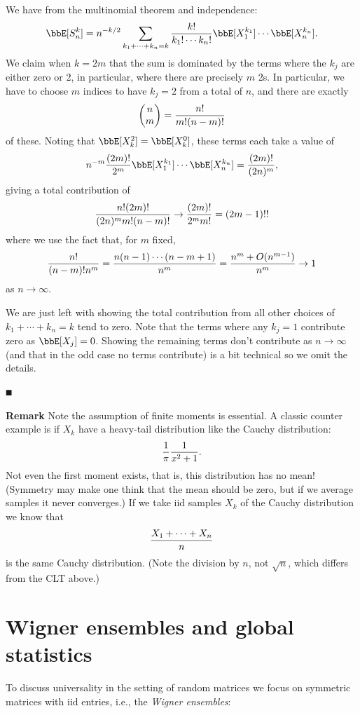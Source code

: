 We have from the multinomial theorem and independence:
\[
\ensuremath{\bbE}[S_n^k] = n^{-k/2} \ensuremath{\sum}_{k_1 + \ensuremath{\cdots} + k_n = k}  {k! \over k_1! \ensuremath{\cdots} k_n!}  \ensuremath{\bbE}[X_1^{k_1}] \ensuremath{\cdots}  \ensuremath{\bbE}[X_n^{k_n}].
\]
We claim when $k = 2m$ that the sum is dominated by the terms where the $k_j$ are either zero or 2, in particular, where there are precisely $m$ 2s. In particular, we have to choose $m$ indices to have $k_j = 2$ from a total of $n$, and  there are exactly
\[
\begin{pmatrix} n \\ m \end{pmatrix} = {n! \over m! (n-m)!}
\]
of these. Noting that $\ensuremath{\bbE}[X_k^2] = \ensuremath{\bbE}[X_k^0]$,  these terms each take a value of
\[
n^{-m} {(2m)! \over 2^m}  \ensuremath{\bbE}[X_1^{k_1}] \ensuremath{\cdots}  \ensuremath{\bbE}[X_n^{k_n}] = {(2m)! \over (2n)^m},
\]
giving a total contribution of
\[
{n! (2m)! \over (2n)^m m! (n-m)!}  \ensuremath{\rightarrow} {(2m)! \over 2^m m!}  = (2m-1)!!
\]
where we use the fact that, for $m$ fixed,
\[
{n! \over (n-m)! n^m} = {n (n-1) \ensuremath{\cdots} (n-m+1) \over n^m} = {n^m + O(n^{m-1}) \over n^m} \ensuremath{\rightarrow} 1
\]
as $n \ensuremath{\rightarrow} \ensuremath{\infty}$.

We are just left with showing the total contribution from all other choices of $k_1 + \ensuremath{\cdots} + k_n = k$ tend to zero. Note that the terms where any $k_j = 1$ contribute zero as $\ensuremath{\bbE}[X_j] = 0$. Showing the remaining terms don't contribute as $n \ensuremath{\rightarrow} \ensuremath{\infty}$ (and that in the odd case no terms contribute) is a bit technical so we omit the details.

\ensuremath{\QED}

\textbf{Remark} Note the assumption of finite moments is essential. A classic counter example is if $X_k$ have a heavy-tail distribution like the Cauchy distribution:
\[
{1 \over \ensuremath{\pi}} {1 \over x^2 + 1}.
\]
Not even the first moment exists, that is, this distribution has no mean! (Symmetry may make one think that the mean should be zero, but if we average samples it never converges.) If we take iid samples $X_k$ of the Cauchy distribution we know that
\[
{X_1 + \ensuremath{\cdots} + X_n \over n}
\]
is the same Cauchy distribution. (Note the division by $n$, not $\sqrt{n}$, which differs from the CLT above.)

\section{Wigner ensembles and global statistics}
To discuss universality in the setting of random matrices we focus on symmetric matrices with iid entries, i.e., the \emph{Wigner ensembles}:

